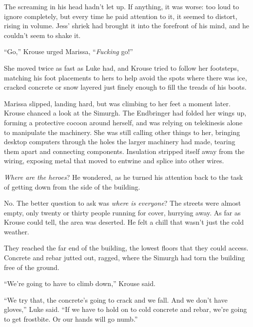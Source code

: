 The screaming in his head hadn't let up.  If anything, it was worse: too loud to ignore completely, but every time he paid attention to it, it seemed to distort, rising in volume.  Jess' shriek had brought it into the forefront of his mind, and he couldn't seem to shake it.



``Go,'' Krouse urged Marissa, ``\emph{Fucking} go!''



She moved twice as fast as Luke had, and Krouse tried to follow her footsteps, matching his foot placements to hers to help avoid the spots where there was ice, cracked concrete or snow layered just finely enough to fill the treads of his boots.



Marissa slipped, landing hard, but was climbing to her feet a moment later.  Krouse chanced a look at the Simurgh.  The Endbringer had folded her wings up, forming a protective cocoon around herself, and was relying on telekinesis alone to manipulate the machinery.  She was still calling other things to her, bringing desktop computers through the holes the larger machinery had made, tearing them apart and connecting components.  Insulation stripped itself away from the wiring, exposing metal that moved to entwine and splice into other wires.



\emph{Where are the heroes}?  He wondered, as he turned his attention back to the task of getting down from the side of the building.



No.  The better question to ask was \emph{where is everyone}?  The streets were almost empty, only twenty or thirty people running for cover, hurrying away.  As far as Krouse could tell, the area was deserted.  He felt a chill that wasn't just the cold weather.



They reached the far end of the building, the lowest floors that they could access.  Concrete and rebar jutted out, ragged, where the Simurgh had torn the building free of the ground.



``We're going to have to climb down,'' Krouse said.



``We try that, the concrete's going to crack and we fall.  And we don't have gloves,'' Luke said.  ``If we have to hold on to cold concrete and rebar, we're going to get frostbite.  Or our hands will go numb.''



